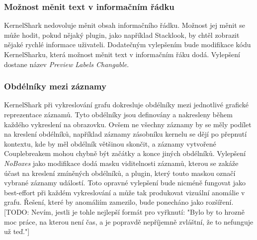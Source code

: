 \subsubsection*{Možnost měnit text v informačním řádku}
KernelShark nedovoluje měnit obsah informačního řádku. Možnost jej měnit se může hodit, pokud nějaký plugin, jako například Stacklook, by chtěl zobrazit nějaké rychlé informace uživateli. Dodatečným vylepšením bude modifikace kódu KernelSharku, která možnost měnit text v informačním řáku dodá. Vylepšení dostane název \emph{Preview Labels Changable}.

\subsubsection*{Obdélníky mezi záznamy}
KernelShark při vykreslování grafu dokresluje obdélníky mezi jednotlivé grafické reprezentace záznamů. Tyto obdélníky jsou definovány a nakresleny během každého vykreslení na obrazovku. Ovšem ne všechny záznamy by se měly podílet na kreslení obdélníků, například záznamy zásobníku kernelu se dějí po přepnutí kontextu, kde by měl obdélník většinou skončit, a záznamy vytvořené Couplebreakem mohou chybně být začátky a konce jiných obdélníků. Vylepšení \emph{NoBoxes} jako modifikace dodá masku viditelnosti záznamů, kterou se zakáže účast na kreslení zmíněných obdélníků, a plugin, který touto maskou označí vybrané záznamy událostí. Toto opravné vylepšení bude nicméně fungovat jako best-effort při každém vykreslování a může tak produkovat vizuální anomálie v grafu. Řešení, které by anomáliím zamezilo, bude ponecháno jako rozšíření. [TODO: Nevím, jestli je tohle nejlepší formát pro vyřknutí: "Bylo by to hrozně moc práce, na kterou není čas, a je popravdě nepříjemně zvláštní, že to nefunguje už teď."]